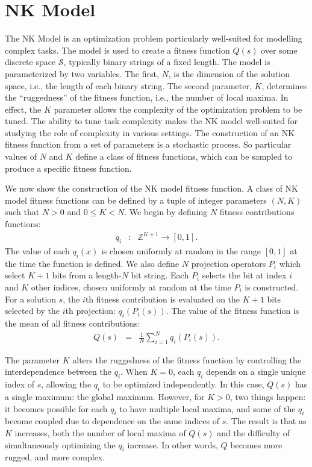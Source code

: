 \documentclass[twocolumn,10pt]{article}
\begin{document}
\section{NK Model}
\label{subsec:task}
The NK Model \cite{kauffman_towards_1987} is an optimization problem particularly well-suited for modelling complex tasks. The model is used to create a fitness function $Q(s)$ over some discrete space $\mathcal{S}$, typically binary strings of a fixed length.
The model is parameterized by two variables.
The first, $N$, is the dimension of the solution space, i.e., the length of each binary string.
The second parameter, $K$, determines the ``ruggedness'' of the fitness function, i.e., the number of local maxima.
In effect, the $K$ parameter allows the complexity of the optimization problem to be tuned.
The ability to tune task complexity makes the NK model well-suited for studying the role of complexity in various settings.
The construction of an NK fitness function from a set of parameters is a stochastic process.
So particular values of $N$ and $K$ define a class of fitness functions, which can be sampled to produce a specific fitness function.

We now show the construction of the NK model fitness function.
A class of NK model fitness functions can be defined by a tuple of integer parameters
$(N, K)$ such that $N > 0$ and $0 \leq K < N$.
We begin by defining $N$ fitness contributions functions:
\begin{eqnarray}
q_i &:& \mathbb{Z}^{K+1} \rightarrow [0, 1].
\end{eqnarray}
The value of each $q_i(x)$ is chosen uniformly at random in the range $[0, 1]$ at the time the function is defined.
We also define $N$ projection operators $P_i$ which select $K+1$ bits from a length-$N$ bit string.
Each $P_i$ selects the bit at index $i$ and $K$ other indices, chosen uniformly at random at the time $P_i$ is constructed.
For a solution $s$, the $i$th fitness contribution is evaluated on the $K + 1$ bits selected by the $i$th projection: $q_i(P_i(s))$.
The value of the fitness function is the mean of all fitness contributions:
\begin{eqnarray}
Q(s) &=& \frac{1}{N}\sum_{i=1}^N q_i(P_i(s)).
\end{eqnarray}

The parameter $K$ alters the ruggedness of the fitness function by controlling the interdependence between the $q_i$.
When $K = 0$, each $q_i$ depends on a single unique index of $s$,
allowing the $q_i$ to be optimized independently.
In this case, $Q(s)$ has a single maximum: the global maximum.
However, for $K > 0$, two things happen: it becomes possible for each $q_i$ to have multiple local maxima, and some of the $q_i$ become coupled due to dependence on the same indices of $s$.
The result is that as $K$ increases, both the number of local maxima of $Q(s)$ \cite{weinberger_local_1991} and the difficulty of simultaneously optimizing the $q_i$ increase.
In other words, $Q$ becomes more rugged, and more complex.
\end{document}

